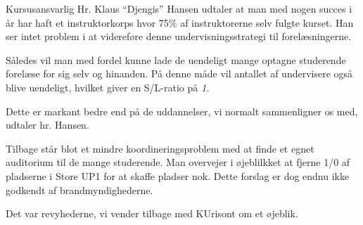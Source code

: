 \documentclass[a4paper]{article}
\begin{document}
\begin{sketch}
Kursusansvarlig Hr. Klaus ``Djengis'' Hansen udtaler at man med nogen
succes i år har haft et instruktorkorps hvor 75\% af instruktorerne selv
fulgte kurset. Han ser intet problem i at videreføre denne
undervisningsstrategi til forelæsningerne.

Således vil man med fordel kunne lade de uendeligt mange optagne
studerende forelæse for sig selv og hinanden. På denne måde vil antallet af
undervisere også blive uendeligt, hvilket giver en S/L-ratio på \em{1}.

Dette er markant bedre end på de uddannelser, vi normalt sammenligner os med,
udtaler hr. Hansen.

Tilbage står blot et mindre koordineringsproblem med at finde et
egnet auditorium til de mange studerende. Man overvejer i øjeblilkket at
fjerne 1/0 af pladserne i Store UP1 for at skaffe pladser nok. Dette forslag
er dog endnu ikke godkendt af brandmyndighederne.

 Det var revyhederne, vi vender tilbage med KUrisont om et øjeblik.

\end{sketch}
\end{document}
